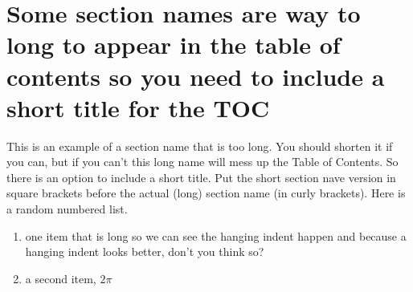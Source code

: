 \section[Long Section Names]{Some section names are way to long to appear in the table of contents so you need to include a short title for the TOC}
This is an example of a section name that is too long.  You should shorten it if you can, but if you can't this long name will mess up the Table of Contents.  So there is an option to include a short title.  Put the short section nave version in square brackets before the actual (long) section name (in curly brackets).
Here is a random numbered list.
\begin{enumerate}
	\item one item that is long so we can see the hanging indent happen and because a hanging indent looks better, don't you think so?
	\item a second item, $2 \pi$
	
\end{enumerate}

